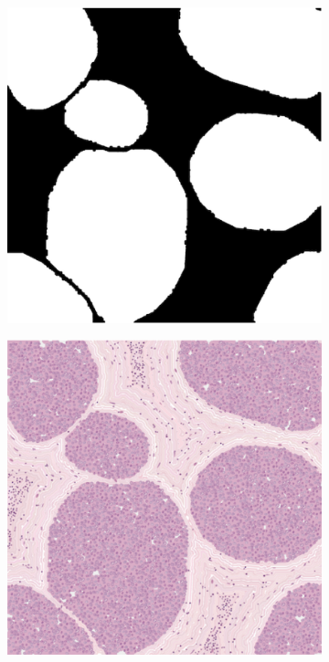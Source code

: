     \begin{figure}[ht]
        \centering
        \begin{subfigure}[t]{0.3\textwidth}
             \centering
             \includegraphics[width = \textwidth]{images/morpho_mask}
             \caption{}
             \label{fig:morpho_mask}
        \end{subfigure}
        \quad
        \begin{subfigure}[t]{0.3\textwidth}
             \centering
             \includegraphics[width = \textwidth]{images/morpho_model}

\end{subfigure}
\end{figure}

